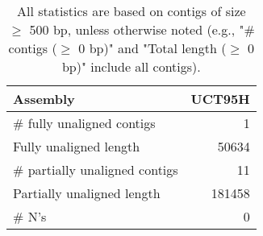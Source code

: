 \documentclass[12pt,a4paper]{article}
\begin{document}
\begin{table}[ht]
\begin{center}
\caption{All statistics are based on contigs of size $\geq$ 500 bp, unless otherwise noted (e.g., "\# contigs ($\geq$ 0 bp)" and "Total length ($\geq$ 0 bp)" include all contigs).}
\begin{tabular}{|l*{1}{|r}|}
\hline
Assembly & UCT95H \\ \hline
\# fully unaligned contigs & 1 \\ \hline
Fully unaligned length & 50634 \\ \hline
\# partially unaligned contigs & 11 \\ \hline
Partially unaligned length & 181458 \\ \hline
\# N's & 0 \\ \hline
\end{tabular}
\end{center}
\end{table}
\end{document}
